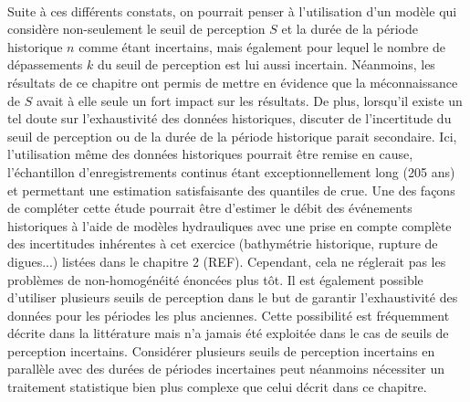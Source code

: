 \documentclass[11pt]{article}
\begin{document}
	\paragraph{} Suite à ces différents constats, on pourrait penser à l'utilisation d'un modèle qui considère non-seulement le seuil de perception $S$ et la durée de la période historique $n$ comme étant incertains, mais également pour lequel le nombre de dépassements $k$ du seuil de perception est lui aussi incertain. Néanmoins, les résultats de ce chapitre ont permis de mettre en évidence que la méconnaissance de $S$ avait à elle seule un fort impact sur les résultats. De plus, lorsqu'il existe un tel doute sur l'exhaustivité des données historiques, discuter de l'incertitude du seuil de perception ou de la durée de la période historique parait secondaire. Ici, l'utilisation même des données historiques pourrait être remise en cause, l'échantillon d'enregistrements continus étant exceptionnellement long (205 ans) et permettant une estimation satisfaisante des quantiles de crue. Une des façons de compléter cette étude pourrait être d'estimer le débit des événements historiques à l'aide de modèles hydrauliques avec une prise en compte complète des incertitudes inhérentes à cet exercice (bathymétrie historique, rupture de digues...) listées dans le chapitre 2 (REF). Cependant, cela ne réglerait pas les problèmes de non-homogénéité énoncées plus tôt. Il est également possible d'utiliser plusieurs seuils de perception dans le but de garantir l'exhaustivité des données pour les périodes les plus anciennes. Cette possibilité est fréquemment décrite dans la littérature mais n'a jamais été exploitée dans le cas de seuils de perception incertains. Considérer plusieurs seuils de perception incertains en parallèle avec des durées de périodes incertaines peut néanmoins nécessiter un traitement statistique bien plus complexe que celui décrit dans ce chapitre.
	
\end{document}
